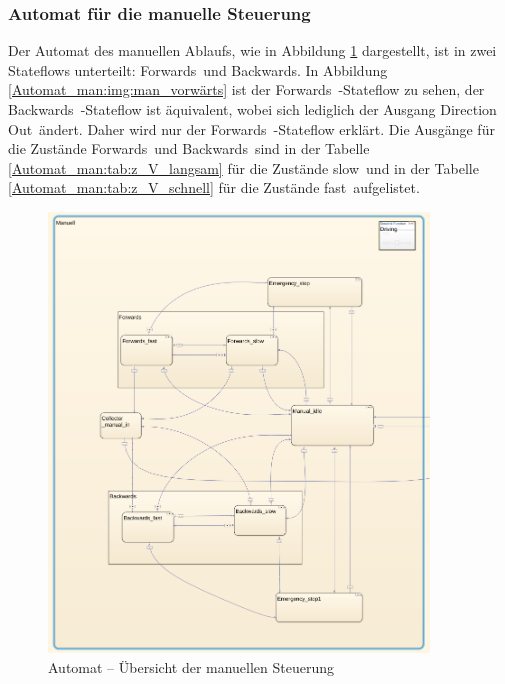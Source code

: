 \subsubsection{Automat für die manuelle Steuerung}
\label{Automatensteuerung:Automat_man}

Der Automat des manuellen Ablaufs, wie in Abbildung \ref{Automat_man:img:man_übersicht} dargestellt, ist in zwei Stateflows unterteilt: \frqq Forwards\flqq\ und \frqq Backwards\flqq . In Abbildung \ref{Automat_man:img:man_vorwärts} ist der \frqq Forwards\flqq\ -Stateflow zu sehen, der \frqq Backwards\flqq\ -Stateflow ist äquivalent, wobei sich lediglich der Ausgang \frqq Direction Out\flqq\ ändert. Daher wird nur der \frqq Forwards\flqq\ -Stateflow erklärt. Die Ausgänge für die Zustände \frqq Forwards\flqq\ und \frqq Backwards\flqq\ sind in der Tabelle \ref{Automat_man:tab:z_V_langsam} für die Zustände \frqq slow\flqq\ und in der Tabelle \ref{Automat_man:tab:z_V_schnell} für die Zustände \frqq fast\flqq\ aufgelistet.




\pagebreak[1]
\begin{figure}[!ht]
	\begin{center}
		\includegraphics[width=0.9\textwidth]{img/5_simulation/Automat_man_uebersicht.png}
		\caption{Automat – Übersicht der manuellen Steuerung}
		\label{Automat_man:img:man_übersicht}
	\end{center}
\end{figure}
\pagebreak[1]


